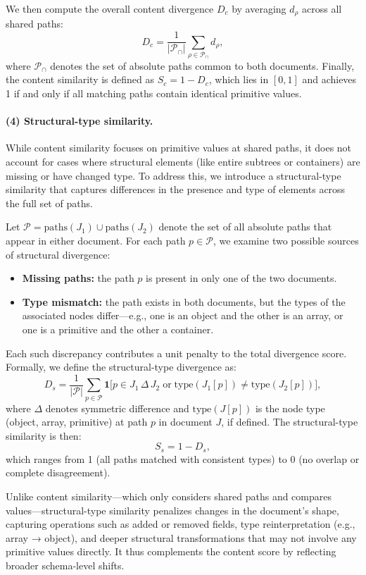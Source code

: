 \documentclass[sigconf]{acmart}
\begin{document}
We then compute the overall content divergence \(D_c\) by averaging \(d_{\rho}\) across all shared paths:
\[
  D_c = \frac{1}{|\mathcal{P}_{\cap}|} \sum_{\rho \in \mathcal{P}_{\cap}} d_{\rho},
\]
where \(\mathcal{P}_{\cap}\) denotes the set of absolute paths common to both documents.  
Finally, the content similarity is defined as \(S_c = 1 - D_c\),  
which lies in \([0,1]\) and achieves 1 if and only if all matching paths contain identical primitive values.

\paragraph{(4) Structural-type similarity.}
While content similarity focuses on primitive values at shared paths, it does not account for cases where structural elements (like entire subtrees or containers) are missing or have changed type.  
To address this, we introduce a structural-type similarity that captures differences in the presence and type of elements across the full set of paths.

Let \(\mathcal{P} = \text{paths}(J_1) \cup \text{paths}(J_2)\) denote the set of all absolute paths that appear in either document.  
For each path \(p \in \mathcal{P}\), we examine two possible sources of structural divergence:

\begin{itemize}
  \item \textbf{Missing paths:} the path \(p\) is present in only one of the two documents.
  \item \textbf{Type mismatch:} the path exists in both documents, but the types of the associated nodes differ—e.g., one is an object and the other is an array, or one is a primitive and the other a container.
\end{itemize}

Each such discrepancy contributes a unit penalty to the total divergence score.  
Formally, we define the structural-type divergence as:
\[
  D_s = \frac{1}{|\mathcal{P}|} \sum_{p \in \mathcal{P}} \mathbf{1}\bigl[
    p \in J_1 \,\Delta\, J_2 \;\text{or}\; \text{type}(J_1[p]) \ne \text{type}(J_2[p])
  \bigr],
\]
where \(\Delta\) denotes symmetric difference and \(\text{type}(J[p])\) is the node type (object, array, primitive) at path \(p\) in document \(J\), if defined.  
The structural-type similarity is then:
\[
  S_s = 1 - D_s,
\]
which ranges from 1 (all paths matched with consistent types) to 0 (no overlap or complete disagreement).

Unlike content similarity—which only considers shared paths and compares values—structural-type similarity penalizes changes in the document's shape, capturing operations such as added or removed fields, type reinterpretation (e.g., array → object), and deeper structural transformations that may not involve any primitive values directly.  
It thus complements the content score by reflecting broader schema-level shifts.
\end{document}
